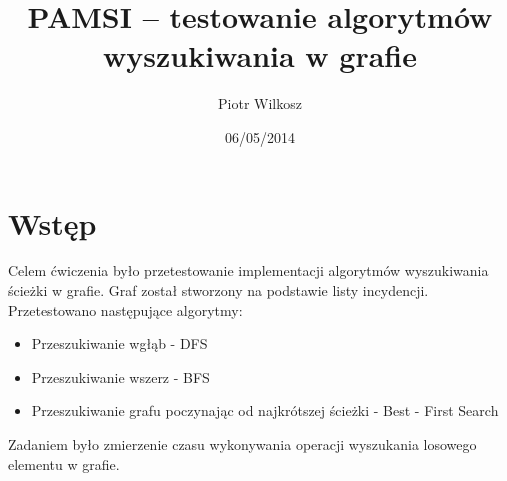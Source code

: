 \documentclass[a4paper,11pt]{article}
\date{06/05/2014}
\title{PAMSI -- testowanie algorytmów wyszukiwania w grafie}
\author{Piotr Wilkosz}
\begin{document}
\maketitle

\section{Wstęp}
Celem ćwiczenia było przetestowanie implementacji algorytmów wyszukiwania ścieżki w grafie. Graf został stworzony 
na podstawie listy incydencji. Przetestowano następujące algorytmy:
  \begin{itemize}
   \item Przeszukiwanie wgłąb - DFS
   \item Przeszukiwanie wszerz - BFS
   \item Przeszukiwanie grafu poczynając od najkrótszej ścieżki - Best - First Search
  \end{itemize}
Zadaniem było zmierzenie czasu wykonywania operacji wyszukania losowego elementu w grafie.
\end{document}
